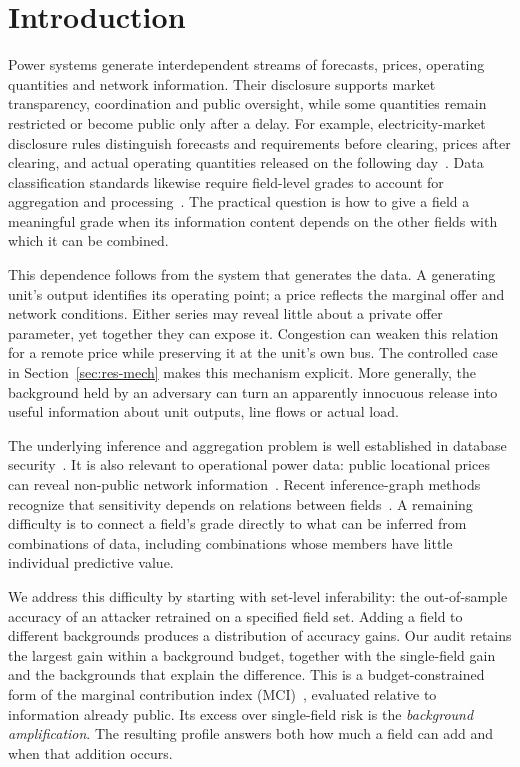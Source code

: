 \section{Introduction}\label{sec:intro}
Power systems generate interdependent streams of forecasts, prices, operating quantities and network information. Their disclosure supports market transparency, coordination and public oversight, while some quantities remain restricted or become public only after a delay. For example, electricity-market disclosure rules distinguish forecasts and requirements before clearing, prices after clearing, and actual operating quantities released on the following day~\cite{nea2024disclosure}. Data classification standards likewise require field-level grades to account for aggregation and processing~\cite{gbt43697}. The practical question is how to give a field a meaningful grade when its information content depends on the other fields with which it can be combined.

This dependence follows from the system that generates the data. A generating unit's output identifies its operating point; a price reflects the marginal offer and network conditions. Either series may reveal little about a private offer parameter, yet together they can expose it. Congestion can weaken this relation for a remote price while preserving it at the unit's own bus. The controlled case in Section~\ref{sec:res-mech} makes this mechanism explicit. More generally, the background held by an adversary can turn an apparently innocuous release into useful information about unit outputs, line flows or actual load.

The underlying inference and aggregation problem is well established in database security~\cite{lunt1989aggregation,farkas2002inference}. It is also relevant to operational power data: public locational prices can reveal non-public network information~\cite{kekatos2014topology}. Recent inference-graph methods recognize that sensitivity depends on relations between fields~\cite{hu2026ignn}. A remaining difficulty is to connect a field's grade directly to what can be inferred from combinations of data, including combinations whose members have little individual predictive value.

We address this difficulty by starting with set-level inferability: the out-of-sample accuracy of an attacker retrained on a specified field set. Adding a field to different backgrounds produces a distribution of accuracy gains. Our audit retains the largest gain within a background budget, together with the single-field gain and the backgrounds that explain the difference. This is a budget-constrained form of the marginal contribution index (MCI)~\cite{catav2021mci}, evaluated relative to information already public. Its excess over single-field risk is the \emph{background amplification}. The resulting profile answers both how much a field can add and when that addition occurs.

